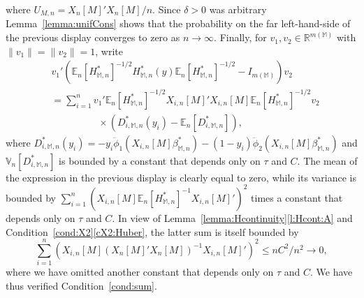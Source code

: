 \documentclass[preprint]{imsart}
\newcommand{\R}{{\mathbb R}}
\newcommand{\E}{{\mathbb E}}
\newcommand{\V}{{\mathbb V}}
\newcommand{\M}{\mathbb M}
\numberwithin{equation}{section}
\begin{document}
where $U_{M,n} = X_n[M]'X_n[M]/n$. Since $\delta>0$ was arbitrary Lemma~\ref{lemma:unifCons} shows that the probability on the far left-hand-side of the previous display converges to zero as $n\to\infty$. Finally, for $v_1, v_2\in\R^{m(\M)}$ with $\|v_1\|=\|v_2\|=1$, write
\begin{align*}
&v_1'(\E_n[H_{\M,n}^*]^{-1/2}H_{\M,n}^*(y)\E_n[H_{\M,n}^*]^{-1/2} - I_{m(\M)})v_2\\
&= \sum_{i=1}^n v_1'\E_n[H_{\M,n}^*]^{-1/2}X_{i,n}[M]'X_{i,n}[M] \E_n[H_{\M,n}^*]^{-1/2}v_2 \\
&\hspace{2cm} \times \left(D_{i,\M,n}^*(y_i) - \E_n[D_{i,\M,n}^*] \right),
\end{align*}
where $D_{i,\M,n}^*(y_i) = -y_i\ddot{\phi}_1(X_{i,n}[M]\beta_{\M,n}^*) - (1-y_i)\ddot{\phi}_2(X_{i,n}[M]\beta_{\M,n}^*)$ and \linebreak $\V_n[D_{i,\M,n}^*]$ is bounded by a constant that depends only on $\tau$ and $C$. The mean of the expression in the previous display is clearly equal to zero, while its variance is bounded by $\sum_{i=1}^n (X_{i,n}[M] \E_n[H_{\M,n}^*]^{-1}X_{i,n}[M]')^2$ times a constant that depends only on $\tau$ and $C$. In view of Lemma~\ref{lemma:Hcontinuity}\ref{l:Hcont:A} and Condition~\ref{cond:X2}\eqref{cX2:Huber}, the latter sum is itself bounded by 
$$\sum_{i=1}^n (X_{i,n}[M] (X_n[M]'X_n[M])^{-1}X_{i,n}[M]')^2 \le n C^2 /n^2 \to 0,$$ where we have omitted another constant that depends only on $\tau$ and $C$. We have thus verified Condition~\ref{cond:sum}.
\end{document}
